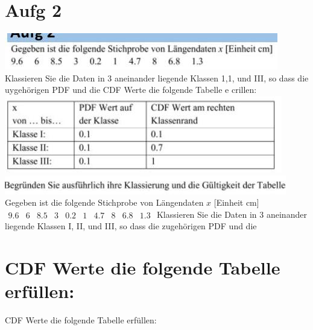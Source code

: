 \documentclass[10pt]{article}
\begin{document}
{\section*{Aufg 2}
\includegraphics[width=\linewidth]{images/2024_12_29_0906b02acf849bda8665g-5(15)}\\
Klassieren Sie die Daten in 3 aneinander liegende Klassen 1,1, und III, so dass die uygehörigen PDF und die CDF Werte die folgende Tabelle e crillen:\\
\includegraphics[width=\linewidth]{images/2024_12_29_0906b02acf849bda8665g-5(2)}\\
\includegraphics[width=\linewidth]{images/2024_12_29_0906b02acf849bda8665g-5(13)}\\
Gegeben ist die folgende Stichprobe von Längendaten $x$ [Einheit cm] $\begin{array}{llllllllll}9.6 & 6 & 8.5 & 3 & 0.2 & 1 & 4.7 & 8 & 6.8 & 1.3\end{array}$ Klassieren Sie die Daten in 3 aneinander liegende Klassen I, II, und III, so dass die zugehörigen PDF und die

\section*{CDF Werte die folgende Tabelle erfüllen:}
CDF Werte die folgende Tabelle erfüllen:

}
\end{document}
